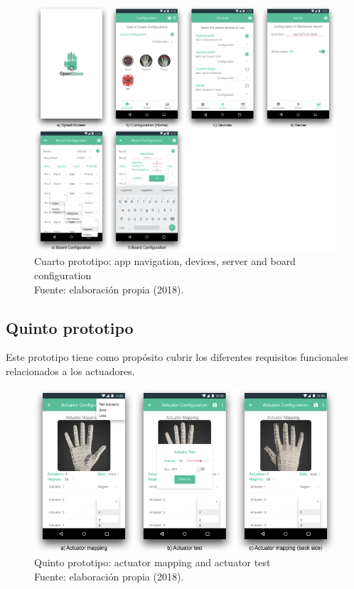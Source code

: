 \begin{figure}[H]
	\centering
	\captionsetup{justification=centering}
   	\includegraphics[width=1.0\textwidth]{images/chapter03/04-prototype/04-prototype.png} 
            \caption[Cuarto prototipo: app navigation, devices, server and board configuration]{Cuarto prototipo: app navigation, devices, server and board configuration \\ Fuente: elaboración propia (2018).}
    \label{fig:prototype-04}
\end{figure}

\subsection{Quinto  prototipo}
\label{quinto-prototipo}
Este prototipo tiene como propósito cubrir los diferentes requisitos funcionales relacionados a los actuadores.

\begin{figure}[H]
	\centering
	\captionsetup{justification=centering}
   	\includegraphics[width=1.0\textwidth]{images/chapter03/05-prototype/05-prototype.png} 
            \caption[Quinto prototipo: actuator mapping and  actuator test]{Quinto prototipo: actuator mapping and actuator test \\ Fuente: elaboración propia (2018).}
    \label{fig:prototype-05}
\end{figure}

